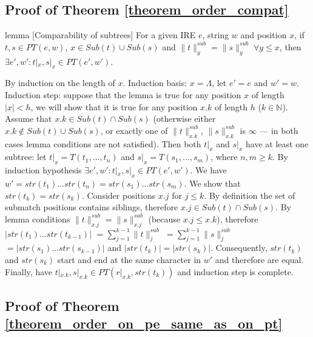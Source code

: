 \documentclass[AMA,STIX1COL]{WileyNJD-v2}
\newcommand{\YN}{\mathbb{N}}
\newcommand{\PT}{PT}
\newcommand{\snorm}[2]{\|{#1}\|^{sub}_{#2}}
\begin{document}


\subsection*{Proof of Theorem \ref{theorem_order_compat}}

\begin{theoremEnd}{lemma}
[Comparability of subtrees]
    \label{lemma_subtrees}
    For a given IRE $e$, string $w$ and position $x$,
    if $t, s \in \PT(e, w)$, $x \in Sub(t) \cup Sub(s)$ and $\snorm{t}{y} = \snorm{s}{y} \; \forall y \leq x$,
    then $\exists e', w' : t|_x, s|_x \in \PT(e', w')$.
\end{theoremEnd}
\begin{proofEnd}
    By induction on the length of $x$.
    Induction basis: $x = \Lambda$, let $e' = e$ and $w' = w$.
    Induction step: suppose that the lemma is true for any position $x$ of length
    $|x| < h$, we will show that it is true for any position $x.k$ of length $h$
    ($k \in \YN$).
    Assume that $x.k \in Sub(t) \cap Sub(s)$
    (otherwise either $x.k \not\in Sub(t) \cup Sub(s)$,
    or exactly one of $\snorm{t}{x.k}$, $\snorm{s}{x.k}$ is $\infty$ --- in both
    cases lemma conditions are not satisfied).
    Then both $t|_x$ and $s|_x$ have at least one subtree: let
    $t|_{x} = T(t_1, \dots, t_n)$ and
    $s|_{x} = T(s_1, \dots, s_m)$, where $n, m \geq k$.
    By induction hypothesis $\exists e', w' : t|_x, s|_x \in \PT(e', w')$.
    We have $w' = str(t_1) \dots str(t_n) = str(s_1) \dots str(s_m)$.
    We show that $str(t_k) = str(s_k)$.
    Consider positions $x.j$ for $j \leq k$.
    By definition the set of submatch positions contains siblings,
    therefore $x.j \in Sub(t) \cap Sub(s)$.
    By lemma conditions $\snorm{t}{x.j} = \snorm{s}{x.j}$ (because $x.j \leq x.k$),
    therefore $|str(t_1) \dots str(t_{k-1})|$
    $= \sum\nolimits_{j=1}^{k-1}\snorm{t}{j}$
    $= \sum\nolimits_{j=1}^{k-1}\snorm{s}{j}$
    $= |str(s_1) \dots str(s_{k-1})|$ and
    $|str(t_k)| = |str(s_k)|$.
    Consequently, $str(t_k)$ and $str(s_k)$ start and end at the same character in $w'$ and therefore are equal.
    Finally, have $t|_{x.k}, s|_{x.k} \in \PT(r|_{x.k}, str(t_k))$ and induction step is complete.
\end{proofEnd}



\subsection*{Proof of Theorem \ref{theorem_order_on_pe_same_as_on_pt}}
\end{document}
